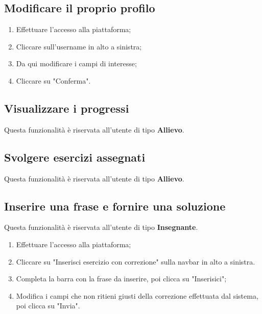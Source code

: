 \documentclass[11pt,a4paper]{article}
\begin{document}
{	\subsection{Modificare il proprio profilo}
	\begin{enumerate}
		\item Effettuare l'accesso alla piattaforma;
		\item Cliccare sull'username in alto a sinistra;
		\item Da qui modificare i campi di interesse;
		\item Cliccare su "Conferma".
	\end{enumerate}
	
	\subsection{Visualizzare i progressi}
	Questa funzionalità è riservata all'utente di tipo \textbf{Allievo}.
	
	\subsection{Svolgere esercizi assegnati}
	Questa funzionalità è riservata all'utente di tipo \textbf{Allievo}.
		
	\subsection{Inserire una frase e fornire una soluzione}
			Questa funzionalità è riservata all'utente di tipo \textbf{Insegnante}.
			\begin{enumerate}
				\item Effettuare l'accesso alla piattaforma;
				\item Cliccare su "Inserisci esercizio con correzione" sulla navbar in alto a sinistra.
				\item Completa la barra con la frase da inserire, poi clicca su "Inserisici";
				\item Modifica i campi che non ritieni giusti della correzione effettuata dal sistema, poi clicca su "Invia". 
			\end{enumerate}

			
}
\end{document}
